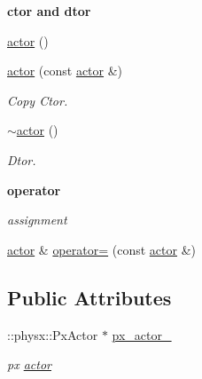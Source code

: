 \begin{Indent}{\bf ctor and dtor}\par
{\em \label{_amgrp98fbd3e5ae66fcd014fb744fec76c58d}
 }\begin{DoxyCompactItemize}
\item 
\hyperlink{classnebula_1_1content_1_1actor_1_1physics_1_1physx_1_1actor_a0c92cb495a7ea1aa8149b2b5adb48cf5}{actor} ()
\item 
\hyperlink{classnebula_1_1content_1_1actor_1_1physics_1_1physx_1_1actor_a2c0d5d6e23d179c31263def0ccabc522}{actor} (const \hyperlink{classnebula_1_1content_1_1actor_1_1physics_1_1physx_1_1actor}{actor} \&)
\begin{DoxyCompactList}\small\item\em Copy Ctor. \item\end{DoxyCompactList}\item 
\hyperlink{classnebula_1_1content_1_1actor_1_1physics_1_1physx_1_1actor_a27fa6e8ccfa32302ebfc2c44f27cb243}{$\sim$actor} ()
\begin{DoxyCompactList}\small\item\em Dtor. \item\end{DoxyCompactList}\end{DoxyCompactItemize}
\end{Indent}
\begin{Indent}{\bf operator}\par
{\em \label{_amgrp4b583376b2767b923c3e1da60d10de59}
 assignment }\begin{DoxyCompactItemize}
\item 
\hyperlink{classnebula_1_1content_1_1actor_1_1physics_1_1physx_1_1actor}{actor} \& \hyperlink{classnebula_1_1content_1_1actor_1_1physics_1_1physx_1_1actor_a2eb5926a96bcef37981ad9fcb55d35e4}{operator=} (const \hyperlink{classnebula_1_1content_1_1actor_1_1physics_1_1physx_1_1actor}{actor} \&)
\end{DoxyCompactItemize}
\end{Indent}
\subsection*{Public Attributes}
\begin{DoxyCompactItemize}
\item 
::physx::PxActor $\ast$ \hyperlink{classnebula_1_1content_1_1actor_1_1physics_1_1physx_1_1actor_a89bbc3e0d34ee15236e76e212cd96902}{px\_\-actor\_\-}
\begin{DoxyCompactList}\small\item\em px \hyperlink{classnebula_1_1content_1_1actor_1_1physics_1_1physx_1_1actor}{actor} \item\end{DoxyCompactList}\end{DoxyCompactItemize}


